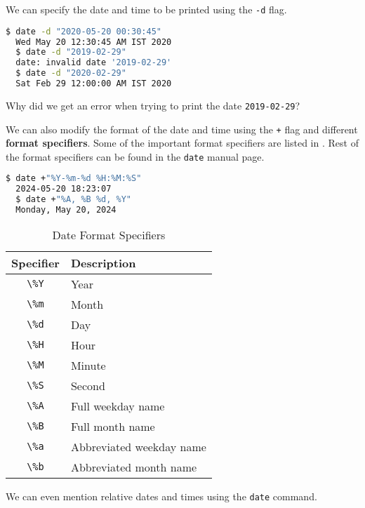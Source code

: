 We can specify the date and time to be printed using the \lstinline|-d| flag.

\begin{lstlisting}[language=bash]
  $ date -d "2020-05-20 00:30:45"
  Wed May 20 12:30:45 AM IST 2020
  $ date -d "2019-02-29"
  date: invalid date '2019-02-29'
  $ date -d "2020-02-29"
  Sat Feb 29 12:00:00 AM IST 2020
\end{lstlisting}

\begin{exercise}
  Why did we get an error when trying to print the date \lstinline|2019-02-29|?
\end{exercise}

We can also modify the format of the date and time using the \lstinline|+| flag and different \textbf{format specifiers}.
Some of the important format specifiers are listed in .
Rest of the format specifiers can be found in the \lstinline|date| manual page.

\begin{lstlisting}[language=bash]
  $ date +"%Y-%m-%d %H:%M:%S"
  2024-05-20 18:23:07
  $ date +"%A, %B %d, %Y"
  Monday, May 20, 2024
\end{lstlisting}

\begin{table}[h]
\caption{Date Format Specifiers}
\begin{tabular}{ c l }
  \toprule
 Specifier & Description \\
 \midrule
  \lstinline|\%Y| & Year \\
  \lstinline|\%m| & Month \\
  \lstinline|\%d| & Day \\
  \lstinline|\%H| & Hour \\
  \lstinline|\%M| & Minute \\
  \lstinline|\%S| & Second \\
  \lstinline|\%A| & Full weekday name \\
  \lstinline|\%B| & Full month name \\
  \lstinline|\%a| & Abbreviated weekday name \\
  \lstinline|\%b| & Abbreviated month name \\
  \bottomrule
\end{tabular}
\end{table}

We can even mention relative dates and times using the \lstinline|date| command.

